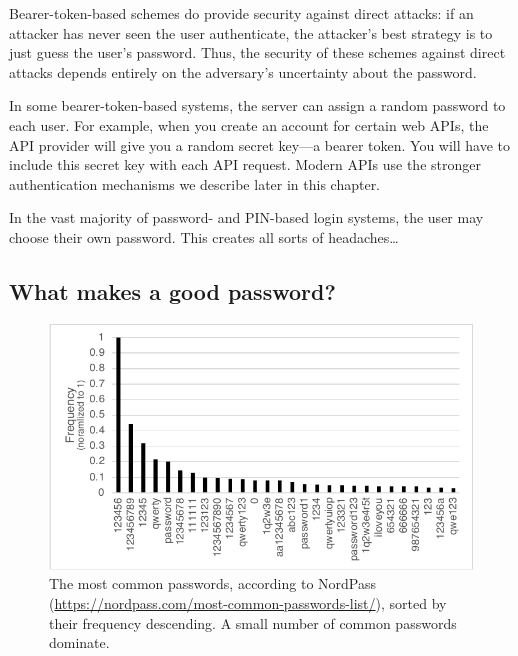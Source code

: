Bearer-token-based schemes do provide security against direct attacks:
if an attacker has never seen the user authenticate, the 
attacker's best strategy is to just guess the user's password.
Thus, the security of these schemes against direct attacks depends
entirely on the adversary's uncertainty about the password.

In some bearer-token-based systems, the server can assign
a random password to each user. For example, when you create 
an account for certain web APIs, the API provider 
will give you a random secret key---a bearer token.
You will have to include this secret key with each API request.
Modern APIs use the stronger authentication mechanisms we describe
later in this chapter.

In the vast majority of password- and PIN-based login systems,
the user may choose their own password.
This creates all sorts of headaches\dots

\subsection{What makes a good password?}

\begin{figure}
  \includegraphics[width=\textwidth]{figs/password-dist.pdf}
  \caption{The most common passwords, according to
  NordPass (\url{https://nordpass.com/most-common-passwords-list/}),
  sorted by their frequency descending.
A small number of common passwords dominate.}
\end{figure}


